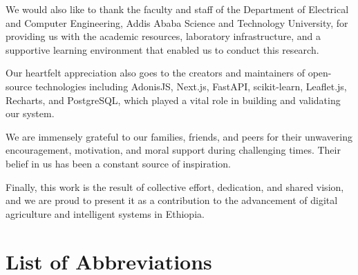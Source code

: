 \documentclass[12pt,a4paper,oneside]{report}
\begin{document}
We would also like to thank the faculty and staff of the Department of Electrical and Computer Engineering, Addis Ababa Science and Technology University, for providing us with the academic resources, laboratory infrastructure, and a supportive learning environment that enabled us to conduct this research.

Our heartfelt appreciation also goes to the creators and maintainers of open-source technologies including AdonisJS, Next.js, FastAPI, scikit-learn, Leaflet.js, Recharts, and PostgreSQL, which played a vital role in building and validating our system.

We are immensely grateful to our families, friends, and peers for their unwavering encouragement, motivation, and moral support during challenging times. Their belief in us has been a constant source of inspiration.

Finally, this work is the result of collective effort, dedication, and shared vision, and we are proud to present it as a contribution to the advancement of digital agriculture and intelligent systems in Ethiopia.

\tableofcontents
\newpage

\listoffigures
\newpage

\listoftables
\newpage

\chapter*{List of Abbreviations}
\end{document}
